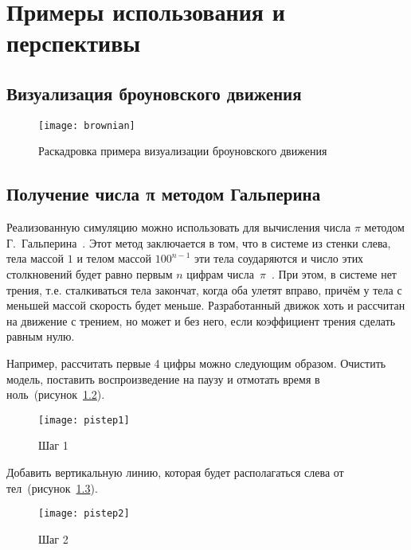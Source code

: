 \chapter{Примеры использования и перспективы}

\TODO

\section{Визуализация броуновского движения}

\TODO

\begin{figure}[H]
    \centering
    \texttt{[image: brownian]}
    \caption{Раскадровка примера визуализации броуновского движения\label{brownianfig}}
\end{figure}

\section{Получение числа π методом Гальперина}\label{pipool}

Реализованную симуляцию можно использовать для вычисления числа \(\pi\)
методом Г.~Гальперина~\cite{poolpi}.
Этот метод заключается в том, что в системе из стенки слева,
тела массой \(1\) и телом массой \(100^{n - 1}\) эти тела соударяются и число этих столкновений
будет равно первым \(n\) цифрам числа~\(\pi\)~\cite{habrpi}.
При этом, в системе нет трения, т.е. сталкиваться тела закончат, когда оба улетят вправо, причём у тела с меньшей массой скорость будет меньше.
Разработанный движок хоть и рассчитан на движение с трением, но может и без него, если коэффициент трения сделать равным нулю.

Например, рассчитать первые 4 цифры можно следующим образом.
Очистить модель, поставить воспроизведение на паузу и отмотать время в ноль~(рисунок~\ref{pistep1fig}).

\begin{figure}[H]
    \centering
    \texttt{[image: pistep1]}
    \caption{Шаг 1\label{pistep1fig}}
\end{figure}

Добавить вертикальную линию, которая будет располагаться слева от тел~(рисунок~\ref{pistep2fig}).

\begin{figure}[H]
    \centering
    \texttt{[image: pistep2]}
    \caption{Шаг 2\label{pistep2fig}}
\end{figure}

